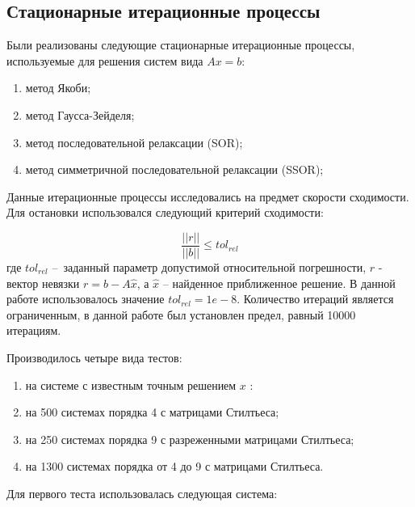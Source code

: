 \subsection{Стационарные итерационные процессы}
Были реализованы следующие стационарные итерационные процессы, используемые для решения систем вида $Ax=b$:

\begin{enumerate}
	\item метод Якоби;
	\item метод Гаусса-Зейделя;
	\item метод последовательной релаксации (SOR);
	\item метод симметричной последовательной релаксации (SSOR);
\end{enumerate}

Данные итерационные процессы исследовались на предмет скорости сходимости. Для остановки использовался следующий критерий сходимости:

\[
\frac{||r||}{||b||} \leq tol_{rel}
\]
где $tol_{rel}$ – заданный параметр допустимой относительной погрешности, $r$ - вектор невязки $r = b - A\hat{x}$, а $\hat{x}$ – найденное приближенное решение. В данной работе использовалось значение $tol_{rel} = 1e-8$. Количество итераций является ограниченным, в данной работе был установлен предел, равный 10000 итерациям.

Производилось четыре вида тестов:
\begin{enumerate}
	\item на системе с известным точным решением $x$ :
	\item на 500 системах порядка 4 с матрицами Стилтьеса;
	\item на 250 системах порядка 9 с разреженными матрицами Стилтьеса;
	\item на 1300 системах порядка от 4 до 9 с матрицами Стилтьеса.
\end{enumerate}

Для первого теста использовалась следующая система:

